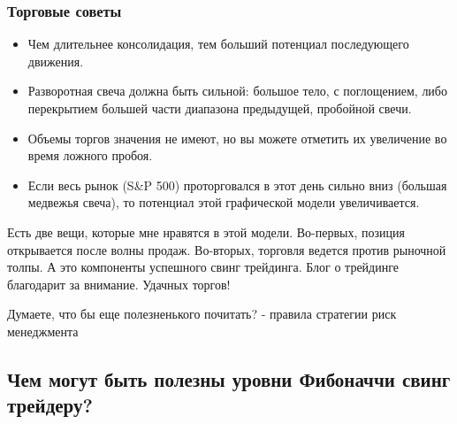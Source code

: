 \documentclass{book}
\begin{document}
\subsubsection{Торговые советы}

\begin{itemize}
\item     Чем длительнее консолидация, тем больший потенциал последующего движения.
\item     Разворотная свеча должна быть сильной: большое тело, с поглощением, либо перекрытием большей части диапазона предыдущей, пробойной свечи.
\item     Объемы торгов значения не имеют, но вы можете отметить их увеличение во время ложного пробоя.
\item     Если весь рынок (S\&P 500) проторговался в этот день сильно вниз (большая медвежья свеча), то потенциал этой графической модели увеличивается.
\end{itemize}

Есть две вещи, которые мне нравятся в этой модели. Во-первых, позиция открывается после волны продаж. Во-вторых, торговля ведется против рыночной толпы. А это компоненты успешного свинг трейдинга. Блог о трейдинге благодарит за внимание. Удачных торгов!


Думаете, что бы еще полезненького почитать? - правила стратегии риск менеджмента

\subsection{Чем могут быть полезны уровни Фибоначчи свинг трейдеру?}
\end{document}

